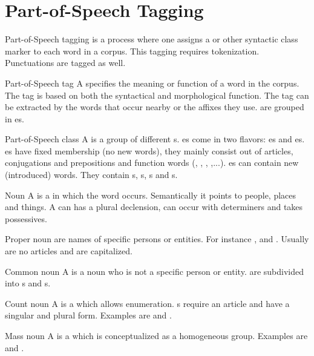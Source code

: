 \section{Part-of-Speech Tagging}
\begin{df}{Part-of-Speech tagging}
\sb{} is a process where one assigns a \pos{} or other syntactic class marker to each word in a corpus. This tagging requires tokenization. Punctuations are tagged as well.
\end{df}
\begin{df}{Part-of-Speech tag}
A \sb{} specifies the meaning or function of a word in the corpus. The tag is based on both the syntactical and morphological function. The tag can be extracted by the words that occur nearby or the affixes they use. \sb{} are grouped in es.
\end{df}
\begin{df}{Part-of-Speech class}
A \sb{} is a group of different s. \sb{}es come in two flavors: es and es. es have fixed membership (no new words), they mainly consist out of articles, conjugations and prepositions and function words (, , , ,...). es can contain new (introduced) words. They contain s, s, s and s.
\end{df}
\begin{df}{Noun}
A \sb{} is a  in which the word occurs. Semantically it points to people, places and things. A \sb{} can has a plural declension, can occur with determiners and takes possessives.
\end{df}
\begin{df}{Proper noun}
\sb{} are names of specific persons or entities. For instance ,  and . Usually \sb{} are no articles and are capitalized.
\end{df}
\begin{df}{Common noun}
A \sb{} is a noun who is not a specific person or entity. \sb{} are subdivided into s and s.
\end{df}
\begin{df}{Count noun}
A \sb{} is a  which allows enumeration. \sb{}s require an article and have a singular and plural form. Examples are  and .
\end{df}
\begin{df}{Mass noun}
A \sb{} is a  which is conceptualized as a homogeneous group. Examples are  and .
\end{df}
